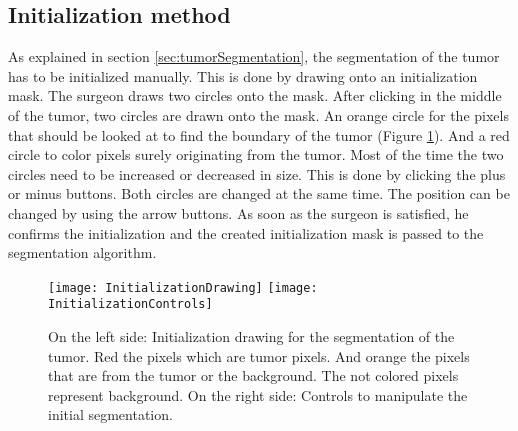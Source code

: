 \subsection{Initialization method}
As explained in section \ref{sec:tumorSegmentation}, the segmentation of the
tumor has to be initialized manually. This is done by drawing onto an
initialization mask. The surgeon draws two circles onto the mask. After clicking in the middle of the tumor, two
circles are drawn onto the mask. An orange
circle for the pixels that should be looked at to find the boundary of the
tumor (Figure \ref{fig:InitializeGraphCut}). And a red circle to color pixels surely
originating from the tumor. Most of the time the two circles need to be
increased or decreased in size. This is done by clicking the plus or minus
buttons. Both circles are changed at the same time. The position can be changed
by using the arrow buttons. As soon as the surgeon is satisfied, he confirms the
initialization and the created initialization mask is passed to the segmentation algorithm.
\begin{figure}[H]
  \centering
  \texttt{[image: InitializationDrawing]}
  \endminipage
  \hfill
  \texttt{[image: InitializationControls]}
  \endminipage
  \hfill
  \caption{On the left side: Initialization drawing for the segmentation of the
    tumor. Red the pixels which are tumor pixels. And orange the pixels that are
    from the tumor or the background. The not colored pixels represent
    background. On the right side: Controls to manipulate the initial segmentation.}
  \label{fig:InitializeGraphCut}
\end{figure}

